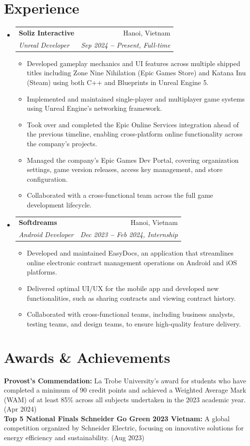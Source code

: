\documentclass[letterpaper,11pt]{article}
\makeatletter
\newcommand{\resumeItem}[1]{
  \item\small{
    {#1 \vspace{-2pt}}
  }
}
\newcommand{\resumeSubheading}[4]{
  \vspace{-2pt}\item
    \begin{tabular*}{0.97\textwidth}[t]{l@{\extracolsep{\fill}}r}
      \textbf{#1} & #2 \\
      \textit{\small#3} & \textit{\small #4} \\
    \end{tabular*}\vspace{-7pt}
}
\newcommand{\resumeSubHeadingListStart}{\begin{itemize}[leftmargin=0.15in, label={}]}
\newcommand{\resumeSubHeadingListEnd}{\end{itemize}}
\newcommand{\resumeItemListStart}{\begin{itemize}}
\newcommand{\resumeItemListEnd}{\end{itemize}\vspace{-5pt}}
\makeatother
\begin{document}

\section{Experience}
\vspace{3pt}
\resumeSubHeadingListStart

\resumeSubheading
{Soliz Interactive}{Hanoi, Vietnam}
{Unreal Developer}{Sep 2024 \textbf{--} Present, Full-time}
\resumeItemListStart
\resumeItem{Developed gameplay mechanics and UI features across multiple shipped titles including Zone Nine Nihilation (Epic Games Store) and Katana Inu (Steam) using both C++ and Blueprints in Unreal Engine 5.}
\resumeItem{Implemented and maintained single-player and multiplayer game systems using Unreal Engine's networking framework.}
\resumeItem{Took over and completed the Epic Online Services integration ahead of the previous timeline, enabling cross-platform online functionality across the company's projects.}
\resumeItem{Managed the company's Epic Games Dev Portal, covering organization settings, game version releases, access key management, and store configuration.}
\resumeItem{Collaborated with a cross-functional team across the full game development lifecycle.}
\resumeItemListEnd

\resumeSubheading
{Softdreams}{Hanoi, Vietnam}
{Android Developer}{Dec 2023 \textbf{--} Feb 2024, Internship}
\resumeItemListStart
\resumeItem{Developed and maintained EasyDocs, an application that streamlines online electronic contract management operations on Android and iOS platforms.}
\resumeItem{Delivered optimal UI/UX for the mobile app and developed new functionalities, such as sharing contracts and viewing contract history.}
\resumeItem{Collaborated with cross-functional teams, including business analysts, testing teams, and design teams, to ensure high-quality feature delivery.}
\resumeItemListEnd

\resumeSubHeadingListEnd




\section{Awards \& Achievements}
\vspace{2pt}
\resumeSubHeadingListStart
\small{\item{
	            \textbf{Provost’s Commendation:}{ La Trobe University's award for students who have completed a minimum of 90 credit points and achieved a Weighted Average Mark (WAM) of at least 85\% across all subjects undertaken in the 2023 academic year. (Apr 2024)} \\ \vspace{3pt}
	            \textbf{Top 5 National Finals Schneider Go Green 2023 Vietnam:}{ A global competition organized by Schneider Electric, focusing on innovative solutions for energy efficiency and sustainability. (Aug 2023)} \\ \vspace{3pt}
	      }}
\resumeSubHeadingListEnd
\end{document}
